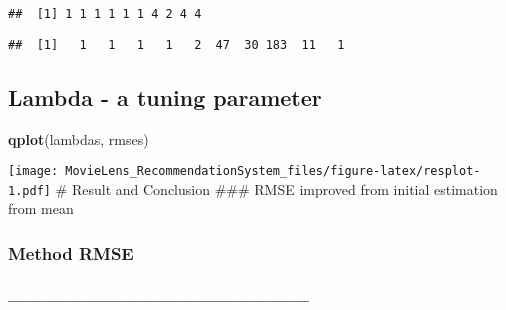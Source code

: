 \documentclass[
]{article}
\newenvironment{Shaded}{\begin{snugshade}}{\end{snugshade}}
\newcommand{\DataTypeTok}[1]{\textcolor[rgb]{0.13,0.29,0.53}{#1}}
\newcommand{\DecValTok}[1]{\textcolor[rgb]{0.00,0.00,0.81}{#1}}
\newcommand{\KeywordTok}[1]{\textcolor[rgb]{0.13,0.29,0.53}{\textbf{#1}}}
\newcommand{\NormalTok}[1]{#1}
\newcommand{\OperatorTok}[1]{\textcolor[rgb]{0.81,0.36,0.00}{\textbf{#1}}}
\newcommand{\StringTok}[1]{\textcolor[rgb]{0.31,0.60,0.02}{#1}}
\begin{document}
\begin{verbatim}
##  [1] 1 1 1 1 1 1 4 2 4 4
\end{verbatim}

\begin{Shaded}
\end{Shaded}

\begin{verbatim}
##  [1]   1   1   1   1   2  47  30 183  11   1
\end{verbatim}

\hypertarget{lambda---a-tuning-parameter}{%
\subsection{Lambda - a tuning
parameter}\label{lambda---a-tuning-parameter}}

\begin{Shaded}
\begin{Highlighting}[]
\KeywordTok{qplot}\NormalTok{(lambdas, rmses)  }
\end{Highlighting}
\end{Shaded}

\texttt{[image: MovieLens\_RecommendationSystem\_files/figure-latex/resplot-1.pdf]}
\# Result and Conclusion \#\#\# RMSE improved from initial estimation
from mean

\hypertarget{method-rmse}{%
\subsubsection{\textbar{} Method \textbar{} RMSE
\textbar{}}\label{method-rmse}}

\hypertarget{section}{%
\subsubsection{\textbar------------------------------------\textbar------------\textbar{}}\label{section}}
\end{document}
